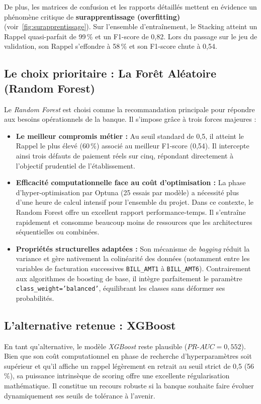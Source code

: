 \documentclass{article}
\begin{document}
De plus, les matrices de confusion et les rapports détaillés mettent en évidence un phénomène critique de \textbf{surapprentissage (overfitting)}(voir~\ref{fig:surapprentissage}). Sur l'ensemble d'entraînement, le Stacking atteint un Rappel quasi-parfait de 99\,\% et un F1-score de 0,82. Lors du passage sur le jeu de validation, son Rappel s'effondre à 58\,\% et son F1-score chute à 0,54.

\subsection{Le choix prioritaire : La Forêt Aléatoire (Random Forest)}
Le \textit{Random Forest} est choisi comme la recommandation principale pour répondre aux besoins opérationnels de la banque. Il s'impose grâce à trois forces majeures :

\begin{itemize}
    \item \textbf{Le meilleur compromis métier :} Au seuil standard de 0,5, il atteint le Rappel le plus élevé (60\,\%) associé au meilleur F1-score (0,54). Il intercepte ainsi trois défauts de paiement réels sur cinq, répondant directement à l'objectif prudentiel de l'établissement.
    \item \textbf{Efficacité computationnelle face au coût d'optimisation :} La phase d'hyper-optimisation par Optuna (25 essais par modèle) a nécessité plus d'une heure de calcul intensif pour l'ensemble du projet. Dans ce contexte, le Random Forest offre un excellent rapport performance-temps. Il s'entraîne rapidement et consomme beaucoup moins de ressources que les architectures séquentielles ou combinées.
    \item \textbf{Propriétés structurelles adaptées :} Son mécanisme de \textit{bagging} réduit la variance et gère nativement la colinéarité des données (notamment entre les variables de facturation successives \texttt{BILL\_AMT1} à \texttt{BILL\_AMT6}). Contrairement aux algorithmes de boosting de base, il intègre parfaitement le paramètre \texttt{class\_weight='balanced'}, équilibrant les classes sans déformer ses probabilités.
\end{itemize}

\subsection{L'alternative retenue : XGBoost}
En tant qu'alternative, le modèle \textit{XGBoost} reste plausible ($PR\text{-}AUC = 0,552$). Bien que son coût computationnel en phase de recherche d'hyperparamètres soit supérieur et qu'il affiche un rappel légèrement en retrait au seuil strict de 0,5 (56\,\%), sa puissance intrinsèque de scoring offre une excellente régularisation mathématique. Il constitue un recours robuste si la banque souhaite faire évoluer dynamiquement ses seuils de tolérance à l'avenir.
\end{document}
